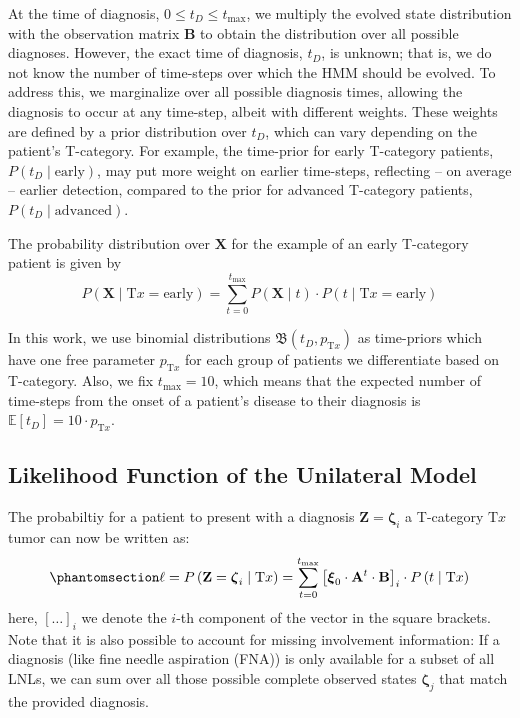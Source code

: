 \documentclass[
  sn-mathphys-num,
]{sn-jnl}
\begin{document}
At the time of diagnosis, \(0 \leq t_D \leq t_\text{max}\), we multiply
the evolved state distribution with the observation matrix
\(\mathbf{B}\) to obtain the distribution over all possible diagnoses.
However, the exact time of diagnosis, \(t_D\), is unknown; that is, we
do not know the number of time-steps over which the HMM should be
evolved. To address this, we marginalize over all possible diagnosis
times, allowing the diagnosis to occur at any time-step, albeit with
different weights. These weights are defined by a prior distribution
over \(t_D\), which can vary depending on the patient's T-category. For
example, the time-prior for early T-category patients,
\(P(t_D \mid \text{early})\), may put more weight on earlier time-steps,
reflecting -- on average -- earlier detection, compared to the prior for
advanced T-category patients, \(P(t_D \mid \text{advanced})\).

The probability distribution over \(\mathbf{X}\) for the example of an
early T-category patient is given by
%
\[
P\left( \mathbf{X} \mid \text{T}x = \text{early} \right) = \sum_{t=0}^{t_\text{max}} P \left( \mathbf{X} \mid t \right) \cdot P(t \mid \text{T}x = \text{early})
\]

In this work, we use binomial distributions
\(\mathfrak{B} \left( t_D, p_{\text{T}x} \right)\) as time-priors which
have one free parameter \(p_{\text{T}x}\) for each group of patients we
differentiate based on T-category. Also, we fix \(t_\text{max} = 10\),
which means that the expected number of time-steps from the onset of a
patient's disease to their diagnosis is
\(\mathbb{E}\left[ t_D \right] = 10 \cdot p_{\text{T}x}\).

\subsection{Likelihood Function of the Unilateral
Model}\label{likelihood-function-of-the-unilateral-model}

The probabiltiy for a patient to present with a diagnosis
\(\mathbf{Z} = \boldsymbol{\zeta}_i\) a T-category \(\text{T}x\) tumor
can now be written as:
%
\begin{equation}\phantomsection\label{eq-single-patient-llh}{
\ell = P \left( \mathbf{Z} = \boldsymbol{\zeta}_i \mid \text{T}x \right) = \sum_{t=0}^{t_\text{max}} \left[ \boldsymbol{\xi}_0 \cdot \mathbf{A}^t \cdot \mathbf{B} \right]_i \cdot P \left( t \mid \text{T}x \right)
}\end{equation}
%
here, \(\left[ \ldots \right]_i\) we denote the \(i\)-th component of
the vector in the square brackets. Note that it is also possible to
account for missing involvement information: If a diagnosis (like fine
needle aspiration (FNA)) is only available for a subset of all LNLs, we
can sum over all those possible complete observed states
\(\boldsymbol{\zeta}_j\) that match the provided diagnosis.
\end{document}
